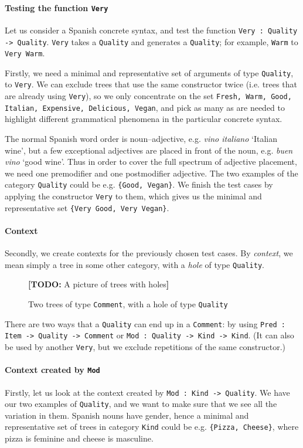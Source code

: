 \documentclass[11pt]{article}
\def\t#1{\texttt{#1}}
\newcommand{\todo}[1]{{\color{cyan}\textbf{[TODO: }#1\textbf{]}}}
\begin{document}
\paragraph{Testing the function \t{Very}}
Let us consider a Spanish concrete syntax, and test the function
\t{Very : Quality -> Quality}. \t{Very} takes a \t{Quality} and
generates a \t{Quality}; for example, \t{Warm} to \t{Very Warm}. 

Firstly, we need a minimal and representative set of arguments of type
\t{Quality}, to \t{Very}. We can exclude trees that use the same
constructor twice (i.e. trees that are already using \t{Very}), so we
only concentrate on the set \t{Fresh, Warm, Good, Italian, Expensive,
  Delicious, Vegan}, and pick as many as are needed to highlight
different grammatical phenomena in the particular concrete syntax.

The normal Spanish word order is noun--adjective, e.g. \emph{vino
  italiano} `Italian wine', but a few exceptional adjectives are
placed in front of the noun, e.g. \emph{buen vino} `good wine'. Thus
in order to cover the full spectrum of adjective placement, we need
one premodifier and one postmodifier adjective. The two examples of
the category \t{Quality} could be e.g. \t{\{Good, Vegan\}}. We finish
the test cases by applying the constructor \t{Very} to them, which
gives us the minimal and representative set \t{\{Very Good, Very
  Vegan\}}.


\paragraph{Context} 

Secondly, we create contexts for the previously chosen test cases. By
\emph{context}, we mean simply a tree in some other category, with a
\emph{hole} of type \t{Quality}. 


\begin{figure}[h]

  \centering
  \todo{A picture of trees with holes}
 \caption{Two trees of type \t{Comment}, with a hole of type \t{Quality}}
\end{figure}

There are two ways that a \t{Quality} can end up in a \t{Comment}: by
using \t{Pred : Item -> Quality -> Comment} or \t{Mod : Quality ->
  Kind -> Kind}. (It can also be used by another \t{Very}, but we
exclude repetitions of the same constructor.)

\paragraph{Context created by \t{Mod}} Firstly, let us look at the context created by \t{Mod : Kind -> Quality}.
We have our two examples of \t{Quality}, and we want to make sure that we see all the variation in them.
Spanish nouns have gender, hence a minimal and representative set of
trees in category \t{Kind} could be e.g. \t{\{Pizza, Cheese\}}, where
pizza is feminine and cheese is masculine.
\end{document}
